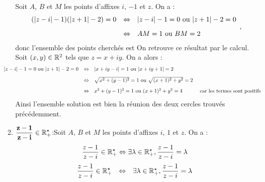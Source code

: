 \documentclass[a4paper, 11pt]{article}
\begin{document}
\begin{correction}
\begin{enumerate}
		      Soit $A$, $B$ et $M$ les points d'affixes $i$, $-1$ et $z$. On a :
		      $$\begin{array}{rcl}
				      (|z-i|-1)(|z+1|-2)=0 & \Leftrightarrow & |z-i|-1=0 \textmd{ ou } |z+1|-2=0\vsec \\
				                           & \Leftrightarrow & AM= 1  \textmd{ ou }  BM=2
			      \end{array},$$
		      donc l'ensemble des points cherch\'es est 
		      \hspace*{0.5cm}
		      \noindent On retrouve ce r\'esultat par le calcul. Soit $(x,y)\in \R^2$ tels que $z=x+iy$. On a alors :
		      $$\hspace*{-1cm}\begin{array}{rcll}
				      |z-i|-1=0 \textmd{ ou } |z+1|-2=0 & \Leftrightarrow & |x+iy-i|=1 \textmd{ ou } |x+iy+1|=2\vsec                                                                     \\
				                                        & \Leftrightarrow & \sqrt{x^2+(y-1)^2} = 1 \textmd{ ou }   \sqrt{(x+1)^2+y^2} = 2\vsec                                           \\
				                                        & \Leftrightarrow & x^2+(y-1)^2 =1 \textmd{ ou }   (x+1)^2+y^2 =  4                    & \textmd{ car les termes sont positifs }\end{array}$$
		      Ainsi l'ensemble solution est bien la r\'eunion des deux cercles trouv\'es pr\'ec\'edemment.
		\item $\mathbf{\ddp\frac{z-1}{z-i} \in \R_+^{\star}}$:Soit $A$, $B$ et $M$ les points d'affixes $i$, $1$ et $z$. On a :\\
		      $$\ddp\frac{z-1}{z-i} \in \R_+^{\star}  \Leftrightarrow \exists \lambda \in \R_+^{\star}, \frac{z-1}{z-i} = \lambda$$
		      $$\begin{array}{rcl}
				      \ddp\frac{z-1}{z-i} \in \R_+^{\star} & \Leftrightarrow & \exists \lambda \in \R_+^{\star}, \ddp \frac{z-1}{z-i} = \lambda\vsec               \\

\end{array}$$
\end{enumerate}
\end{correction}
\end{document}
